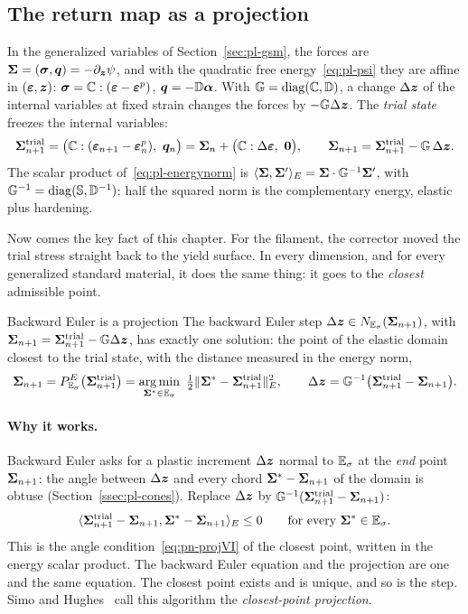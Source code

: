 \subsection{The return map as a projection}\label{ssec:pn-cpp}
In the generalized variables of Section~\ref{sec:pl-gsm}, the forces are
$\bm{\Sigma}=(\bm{\sigma},\bm{q})=-\partial_{\bm{z}}\psi$, and with the quadratic free
energy~\eqref{eq:pl-psi} they are affine in $(\bm{\varepsilon},\bm{z})$:
$\bm{\sigma}=\mathbb{C}:(\bm{\varepsilon}-\bm{\varepsilon}^{p})$, $\bm{q}=-\mathbb{D}\bm{\alpha}$. With
$\mathbb{G}=\operatorname{diag}(\mathbb{C},\mathbb{D})$, a change $\Delta\bm{z}$ of the internal variables
at fixed strain changes the forces by $-\mathbb{G}\Delta\bm{z}$. The \emph{trial
state} freezes the internal variables:
\begin{equation}\label{eq:pn-trial}
  \bm{\Sigma}^{\mathrm{trial}}_{n+1}=\bigl(\mathbb{C}:(\bm{\varepsilon}_{n+1}-\bm{\varepsilon}^{p}_n),\ \bm{q}_n\bigr)
  =\bm{\Sigma}_n+\bigl(\mathbb{C}:\Delta\bm{\varepsilon},\ \bm{0}\bigr),
  \qquad
  \bm{\Sigma}_{n+1}=\bm{\Sigma}^{\mathrm{trial}}_{n+1}-\mathbb{G}\,\Delta\bm{z} .
\end{equation}
The scalar product of~\eqref{eq:pl-energynorm} is
$\langle \bm{\Sigma},\bm{\Sigma}'\rangle_E=\bm{\Sigma}\cdot\mathbb{G}^{-1}\bm{\Sigma}'$, with
$\mathbb{G}^{-1}=\operatorname{diag}(\mathbb{S},\mathbb{D}^{-1})$: half the squared norm is the
complementary energy, elastic plus hardening.

Now comes the key fact of this chapter. For the filament, the corrector moved
the trial stress straight back to the yield surface. In every dimension, and
for every generalized standard material, it does the same thing: it goes to
the \emph{closest} admissible point.
\begin{gbox}{Backward Euler is a projection}\label{thm:pn-cpp}
The backward Euler step $\Delta\bm{z}\in N_{\mathbb{E}_{\sigma}}(\bm{\Sigma}_{n+1})$, with
$\bm{\Sigma}_{n+1}=\bm{\Sigma}^{\mathrm{trial}}_{n+1}-\mathbb{G}\Delta\bm{z}$, has exactly one solution:
the point of the elastic domain closest to the trial state, with the distance
measured in the energy norm,
\begin{equation}\label{eq:pn-cpp}
  \vSig_\np=P^E_{\Esig}\bigl(\vSig^\trial_\np\bigr)
  =\argmin_{\vSig^\ast\in\Esig}\ \tfrac12\norm{\vSig^\ast-\vSig^\trial_\np}_E^2,
  \qquad
  \Delta\vz=\tensf{G}^{-1}\bigl(\vSig^\trial_\np-\vSig_\np\bigr).
\end{equation}
\end{gbox}
\paragraph{Why it works.} Backward Euler asks for a plastic increment
$\Delta\bm{z}$ normal to $\mathbb{E}_{\sigma}$ at the \emph{end} point $\bm{\Sigma}_{n+1}$: the angle
between $\Delta\bm{z}$ and every chord $\bm{\Sigma}^\ast-\bm{\Sigma}_{n+1}$ of the domain is
obtuse (Section~\ref{ssec:pl-cones}). Replace $\Delta\bm{z}$ by
$\mathbb{G}^{-1}(\bm{\Sigma}^{\mathrm{trial}}_{n+1}-\bm{\Sigma}_{n+1})$:
\[
  \langle \bm{\Sigma}^{\mathrm{trial}}_{n+1}-\bm{\Sigma}_{n+1},\bm{\Sigma}^\ast-\bm{\Sigma}_{n+1}\rangle_E\le0\qquad\text{for every }\bm{\Sigma}^\ast\in\mathbb{E}_{\sigma} .
\]
This is the angle condition~\eqref{eq:pn-projVI} of the closest point, written
in the energy scalar product. The backward Euler equation and the projection
are one and the same equation. The closest point exists and is unique, and so
is the step. Simo and Hughes~\cite{SimoHughesCI} call this algorithm the
\emph{closest-point projection}.

